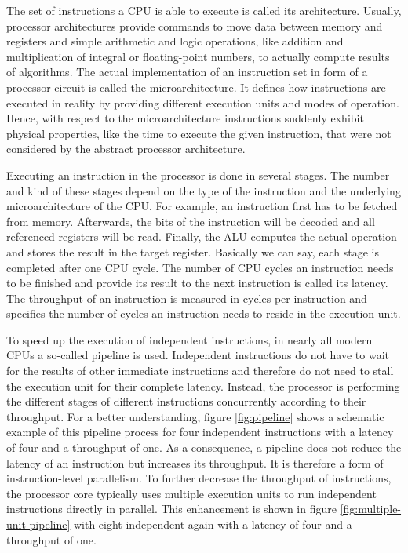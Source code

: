 \documentclass{stdlocal}
\begin{document}
    The set of instructions a CPU is able to execute is called its architecture.
    Usually, processor architectures provide commands to move data between memory and registers and simple arithmetic and logic operations, like addition and multiplication of integral or floating-point numbers, to actually compute results of algorithms.
    The actual implementation of an instruction set in form of a processor circuit is called the microarchitecture.
    It defines how instructions are executed in reality by providing different execution units and modes of operation.
    Hence, with respect to the microarchitecture instructions suddenly exhibit physical properties, like the time to execute the given instruction, that were not considered by the abstract processor architecture.
    \autocite{hennessy2019,patterson2014}

    Executing an instruction in the processor is done in several stages.
    The number and kind of these stages depend on the type of the instruction and the underlying microarchitecture of the CPU.
    For example, an instruction first has to be fetched from memory.
    Afterwards, the bits of the instruction will be decoded and all referenced registers will be read.
    Finally, the ALU computes the actual operation and stores the result in the target register.
    Basically we can say, each stage is completed after one CPU cycle.
    The number of CPU cycles an instruction needs to be finished and provide its result to the next instruction is called its latency.
    The throughput of an instruction is measured in cycles per instruction and specifies the number of cycles an instruction needs to reside in the execution unit.

    To speed up the execution of independent instructions, in nearly all modern CPUs a so-called pipeline is used.
    Independent instructions do not have to wait for the results of other immediate instructions and therefore do not need to stall the execution unit for their complete latency.
    Instead, the processor is performing the different stages of different instructions concurrently according to their throughput.
    For a better understanding, figure \ref{fig:pipeline} shows a schematic example of this pipeline process for four independent instructions with a latency of four and a throughput of one.
    As a consequence, a pipeline does not reduce the latency of an instruction but increases its throughput.
    It is therefore a form of instruction-level parallelism.
    To further decrease the throughput of instructions, the processor core typically uses multiple execution units to run independent instructions directly in parallel.
    This enhancement is shown in figure \ref{fig:multiple-unit-pipeline} with eight independent again with a latency of four and a throughput of one.
\end{document}
